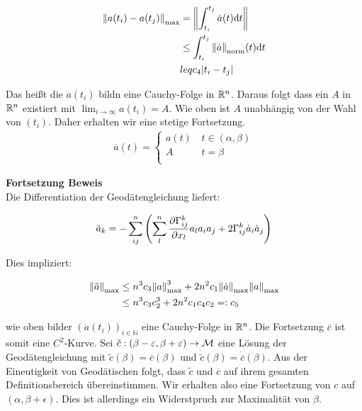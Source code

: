 \begin{bew}
\begin{bew}[Behauptung]
\begin{align*}
\norm{a (t_i) - a(t_j)}_{\text{max}} &= \norm{\int^{t_j}_{t_i} \dot{a} (t) \dd t} \\
&\leq \int^{t_j}_{t_i} \norm{\dot{a}}_{\text{norm}} (t) \dd t\\
&leq c_4 \abs{t_i - t_j}
\end{align*}

Das heißt die $a(t_i)$ bildn eine Cauchy-Folge in $\mathbb{R}^n$.
Daraus folgt dass ein $A$ in $\mathbb{R}^n$ existiert mit 
$\lim_{i\to\infty} a (t_i) = A $.
Wie oben ist $A$ unabhängig von der Wahl von $(t_i)$.
Daher erhalten wir eine stetige Fortsetzung.
\begin{align*}
\overline{a}(t) = \left\{
\begin{array}{ll}
a(t) & \, t\in (\alpha , \beta ) \\
A & \, t = \beta \\
\end{array}
\right.
\end{align*}

\end{bew}
\textbf{Fortsetzung Beweis}\\
Die Differentiation der Geodätengleichung liefert:

\begin{align*}
\ddot{a}_k=-\sum^n_{ij} \left( \sum^n_l \pdv{\Gamma^k_{ij}}{x_l} a_l a_i a_j + 2 
\Gamma^k_{ij}\dot{a}_i \dot{a}_j \right)
\end{align*}

Dies impliziert:

\begin{align*}
    \norm{\ddot{a}}_{\text{max}} &\leq n^3 c_3 \norm{a}^3_{\text{max}} 
    + 2n^2 c_1 \norm{\dot{a}}_{\text{max}} \norm{a}_{\text{max}} \\
    &\leq n^3 c_3 c_2^3 + 2 n^2 c_1 c_4 c_2 =: c_5
\end{align*}

wie oben bilder $( \dot{a} (t_i) )_{i \in \mathbb{N}}$ eine Cauchy-Folge in $\mathbb{R}^n$.
Die Fortsetzung $\overline{c}$ ist somit eine $C^2$-Kurve.
Sei $\tilde{c} : (\beta - \varepsilon , \beta + \varepsilon) \to \mathcal{M}$ eine Lösung
der Geodätengleichung mit $\tilde{c}(\beta) = \overline{c}(\beta)$ und 
$\dot{\tilde{c}}(\beta) = \dot{\overline{c}}(\beta)$.
Aus der Eineutigkeit von Geodätischen folgt, dass $\tilde{c}$ und $\overline{c}$
auf ihrem gesamten Definitionsbereich übereinstimmen.
Wir erhalten also eine Fortsetzung von $c$ auf $(\alpha, \beta + \epsilon)$.
Dies ist allerdings ein Widerstpruch zur Maximalität von $\beta$.



\end{bew}
